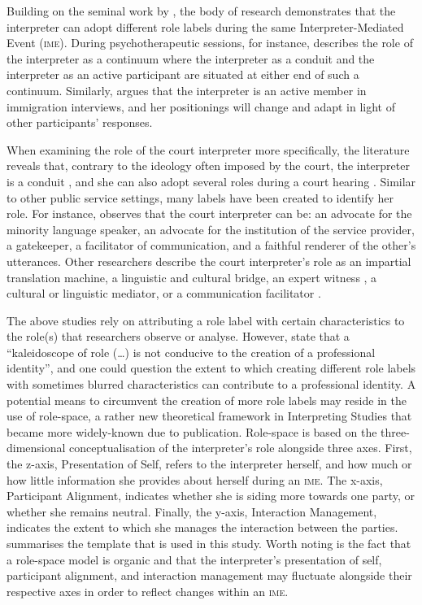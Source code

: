 \documentclass[output=paper]{langsci/langscibook}
\begin{document}
Building on the seminal work by \citet{Wadensjö1998}, the body of research demonstrates that the interpreter can adopt different role labels during the same Inter\-preter-Mediated Event (\textsc{ime}). During psychotherapeutic sessions, \citet{Bot2009} for instance, describes the role of the interpreter as a continuum where the interpreter as a conduit and the interpreter as an active participant are situated at either end of such a continuum. Similarly, \citet{Mason2009} argues that the interpreter is an active member in immigration interviews, and her positionings will change and adapt in light of other participants’ responses. 

When examining the role of the court interpreter more specifically, the literature reveals that, contrary to the ideology often imposed by the court, the interpreter is a conduit \citep{Laster1994}, and she can also adopt several roles during a court hearing \citep{Berk-Seligson1990,Martin2009}. Similar to other public service settings, many labels have been created to identify her role. For instance, \citet{Hale2008} observes that the court interpreter can be: an advocate for the minority language speaker, an advocate for the institution of the service provider, a gatekeeper, a facilitator of communication, and a faithful renderer of the other’s utterances. Other researchers describe the court interpreter’s role as an impartial translation machine, a linguistic and cultural bridge, an expert witness \citep{Mikkelson1998}, a cultural or linguistic mediator, or a communication facilitator \citep{Nartowska2016}.

The above studies rely on attributing a role label with certain characteristics to the role(s) that researchers observe or analyse. However, \citet[32]{Gentile1996} state that a “kaleidoscope of role (…) is not conducive to the creation of a professional identity”, and one could question the extent to which creating different role labels with sometimes blurred characteristics can contribute to a professional identity. A potential means to circumvent the creation of more role labels may reside in the use of role-space, a rather new theoretical framework in Interpreting Studies that became more widely-known due to  publication. Role-space is based on the three-dimensional conceptualisation of the interpreter’s role alongside three axes. First, the z-axis, Presentation of Self, refers to the interpreter herself, and how much or how little information she provides about herself during an \textsc{ime}. The x-axis, Participant Alignment, indicates whether she is siding more towards one party, or whether she remains neutral. Finally, the y-axis, Interaction Management, indicates the extent to which she manages the interaction between the parties.  summarises the template that is used in this study. Worth noting is the fact that a role-space model is organic and that the interpreter’s presentation of self, participant alignment, and interaction management may fluctuate alongside their respective axes in order to reflect changes within an \textsc{ime}.
\end{document}
